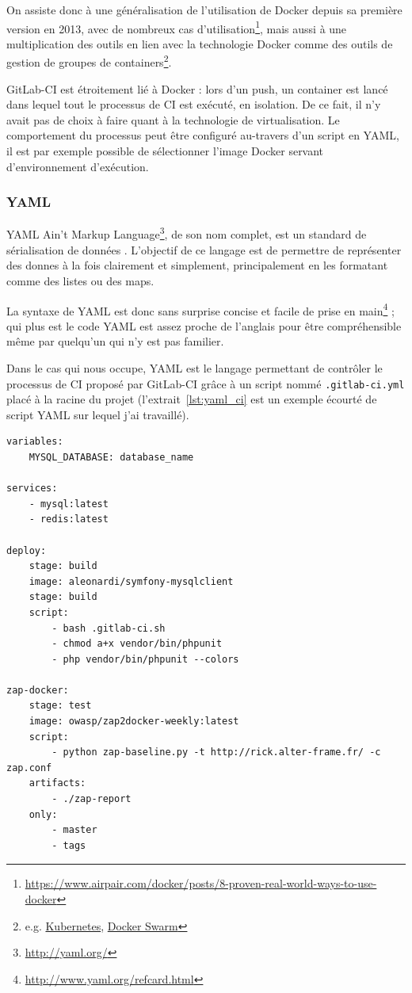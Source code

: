 On assiste donc à une généralisation de l'utilisation de Docker depuis sa première version en 2013, avec de nombreux cas d'utilisation\footnote{\url{https://www.airpair.com/docker/posts/8-proven-real-world-ways-to-use-docker}}, mais aussi à une multiplication des outils en lien avec la technologie Docker comme des outils de gestion de groupes de containers\footnote{e.g. \href{https://kubernetes.io/}{Kubernetes}, \href{https://docs.docker.com/engine/swarm/}{Docker Swarm}}.

GitLab-CI est étroitement lié à Docker : lors d'un push, un container est lancé dans lequel tout le processus de CI est exécuté, en isolation. De ce fait, il n'y avait pas de choix à faire quant à la technologie de virtualisation. Le comportement du processus peut être configuré au-travers d'un script en YAML, il est par exemple possible de sélectionner l'image Docker servant d'environnement d'exécution.

\subsubsection{YAML}
YAML Ain't Markup Language\footnote{\url{http://yaml.org/}}, de son nom complet, est un \og standard de sérialisation de données \fg. L'objectif de ce langage est de permettre de représenter des donnes à la fois clairement et simplement, principalement en les formatant comme des listes ou des maps. 

La syntaxe de YAML est donc sans surprise concise et facile de prise en main\footnote{\url{http://www.yaml.org/refcard.html}} ; qui plus est le code YAML est assez proche de l'anglais pour être compréhensible même par quelqu'un qui n'y est pas familier. 

Dans le cas qui nous occupe, YAML est le langage permettant de contrôler le processus de CI proposé par GitLab-CI grâce à un script nommé \verb|.gitlab-ci.yml| placé à la racine du projet (l'extrait~\ref{lst:yaml_ci} est un exemple écourté de script YAML sur lequel j'ai travaillé). 

\begin{minipage}{\linewidth}
    \begin{lstlisting}[caption={Script de contrôle de processus de CI en YAML},label={lst:yaml_ci}]
variables:
    MYSQL_DATABASE: database_name

services:
    - mysql:latest
    - redis:latest

deploy:
    stage: build
    image: aleonardi/symfony-mysqlclient
    stage: build
    script:
        - bash .gitlab-ci.sh
        - chmod a+x vendor/bin/phpunit
        - php vendor/bin/phpunit --colors

zap-docker:
    stage: test
    image: owasp/zap2docker-weekly:latest
    script:
        - python zap-baseline.py -t http://rick.alter-frame.fr/ -c zap.conf
    artifacts:
        - ./zap-report
    only:
        - master
        - tags
    \end{lstlisting}
\end{minipage}

